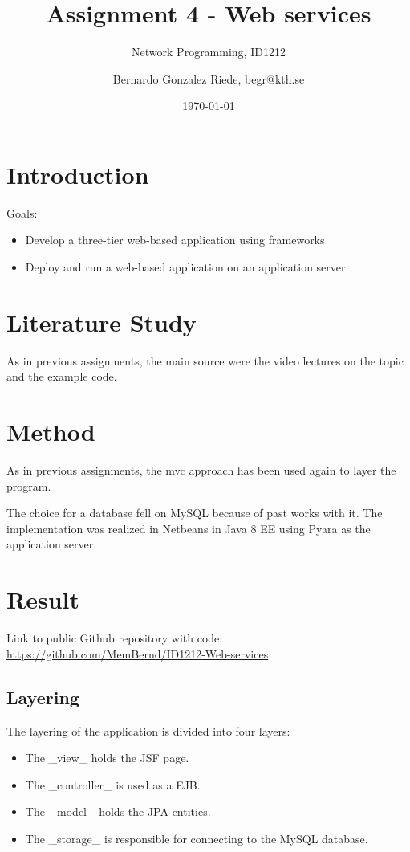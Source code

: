 \documentclass[a4paper]{scrartcl}
\title{Assignment 4 - Web services}
\subtitle{Network Programming, ID1212}
\author{Bernardo Gonzalez Riede, begr@kth.se}
\date{\today}
\begin{document}
\maketitle

\section{Introduction}
Goals:
\begin{itemize}
	\item Develop a three-tier web-based application using frameworks
	\item Deploy and run a web-based application on an application server.
\end{itemize}


\section{Literature Study}
As in previous assignments, the main source were the video lectures on the topic and the example code.

\section{Method}
As in previous assignments, the mvc approach has been used again to layer the program.

The choice for a database fell on MySQL because of past works with it.
The implementation was realized in Netbeans in Java 8 EE using Pyara as the application server.


\section{Result}

Link to public Github repository with code:
\href{https://github.com/MemBernd/ID1212-Web-services}{https://github.com/MemBernd/ID1212-Web-services}

\subsection{Layering}
The layering of the application is divided into four layers:
\begin{itemize}
	\item The _view_ holds the JSF page.
	\item The _controller_ is used as a EJB.
	\item The _model_ holds the JPA entities.
	\item The _storage_ is responsible for connecting to the MySQL database.
\end{itemize}
\end{document}
